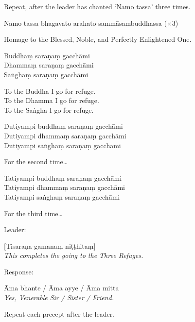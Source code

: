 \begin{instruction}
  Repeat, after the leader has chanted ‘Namo tassa’ three times.
\end{instruction}

Namo tassa bhagavato arahato sammāsambuddhassa (×3)

\begin{english}
  Homage to the Blessed, Noble, and Perfectly Enlightened One.
\end{english}

Buddhaṃ saraṇaṃ gacchāmi\\
Dhammaṃ saraṇaṃ gacchāmi\\
Saṅghaṃ saraṇaṃ gacchāmi

\begin{english}
  To the Buddha I go for refuge.\\
  To the Dhamma I go for refuge.\\
  To the Saṅgha I go for refuge.
\end{english}

Dutiyampi buddhaṃ saraṇaṃ gacchāmi\\
Dutiyampi dhammaṃ saraṇaṃ gacchāmi\\
Dutiyampi saṅghaṃ saraṇaṃ gacchāmi

\begin{english}
  For the second time\ldots
\end{english}

Tatiyampi buddhaṃ saraṇaṃ gacchāmi\\
Tatiyampi dhammaṃ saraṇaṃ gacchāmi\\
Tatiyampi saṅghaṃ saraṇaṃ gacchāmi

\begin{english}
  For the third time\ldots
\end{english}

\begin{instruction}
  Leader:
\end{instruction}

[Tisaraṇa-gamanaṃ niṭṭhitaṃ]\\
\emph{This completes the going to the Three Refuges.}

\begin{instruction}
  Response:
\end{instruction}

Āma bhante / Āma ayye / Āma mitta\\
\emph{Yes, Venerable Sir / Sister / Friend.}

\begin{instruction}
  Repeat each precept after the leader.
\end{instruction}


